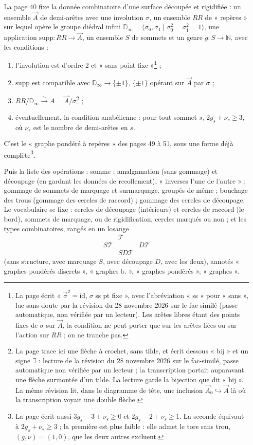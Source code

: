 \documentclass[11pt,a4paper]{article}
\begin{document}
La page 40 fixe la donnée combinatoire d'une surface découpée et rigidifiée :
un ensemble $\vec{A}$ de demi-arêtes avec une involution $\sigma$, un ensemble
$RR$ de « repères » sur lequel opère le groupe diédral infini
$\mathbb{D}_\infty = \langle \sigma_0, \sigma_1 \mid \sigma_0^2 = \sigma_1^2 =
1 \rangle$, une application $\mathrm{supp} : RR \to \vec{A}$, un ensemble $S$ de
sommets et un genre $g : S \to \mathbb{N}$, avec les conditions :
\begin{enumerate}
\item[a)] l'involution est d'ordre $2$ et « sans point fixe »\footnote{La page
écrit « $\vec{\sigma}^{2} = \mathrm{id}$, $\sigma$ ss pt fixe », avec
l'abréviation « ss » pour « sans », lue sans doute par la révision du
28 novembre 2026 sur le fac-similé (passe automatique, non vérifiée par un
lecteur). Les arêtes libres étant des points fixes de $\sigma$ sur $\vec{A}$,
la condition ne peut porter que sur les arêtes liées ou sur l'action sur $RR$ ;
on ne tranche pas.} ;
\item[b)] $\mathrm{supp}$ est compatible avec $\mathbb{D}_\infty \to \{\pm 1\}$,
$\{\pm 1\}$ opérant sur $\vec{A}$ par $\sigma$ ;
\item[c)] $RR/\mathbb{D}_\infty \xrightarrow{\sim} A = \vec{A}/\sigma$\footnote{La
page trace ici une flèche à crochet, sans tilde, et écrit dessous « bij » et
un signe $\exists$ : lecture de la révision du 28 novembre 2026 sur le
fac-similé, passe automatique non vérifiée par un lecteur ; la transcription
portait auparavant une flèche surmontée d'un tilde. La lecture garde la
bijection que dit « bij ». La même révision lit, dans le diagramme de tête,
une inclusion $\vec{A}_0 \hookrightarrow \vec{A}$ là où la transcription
voyait une double flèche.} ;
\item[d)] éventuellement, la condition anabélienne : pour tout sommet $s$, $2g_s
+ \nu_s \geq 3$, où $\nu_s$ est le nombre de demi-arêtes en $s$.
\end{enumerate}
C'est le « graphe pondéré à repères » des pages 49 à 51, sous une forme déjà
complète\footnote{La page écrit aussi $3g_s - 3 + \nu_s \geq 0$ et $2g_s - 2 +
\nu_s \geq 1$. La seconde équivaut à $2g_s + \nu_s \geq 3$ ; la première est
plus faible : elle admet le tore sans trou, $(g, \nu) = (1, 0)$, que les deux
autres excluent.}.

Puis la liste des opérations : somme ; amalgamation (sans gommage) et découpage
(en gardant les données de recollement), « inverses l'une de l'autre » ; gommage
de sommets de marquage et surmarquage, groupés de même ; bouchage des trous
(gommage des cercles de raccord) ; gommage des cercles de découpage. Le
vocabulaire se fixe : cercles de découpage (intérieurs) et cercles de raccord
(le bord), sommets de marquage, ou de rigidification, cercles marqués ou non ; et
les types combinatoires, rangés en un losange
\[
\begin{array}{ccc}
 & \mathcal{T} & \\
S\mathcal{T} & & D\mathcal{T} \\
 & SD\mathcal{T} &
\end{array}
\]
(sans structure, avec marquage $S$, avec découpage $D$, avec les deux),
annotés « graphes pondérés discrets », « graphes b. », « graphes pondérés »,
« graphes ».
\end{document}
